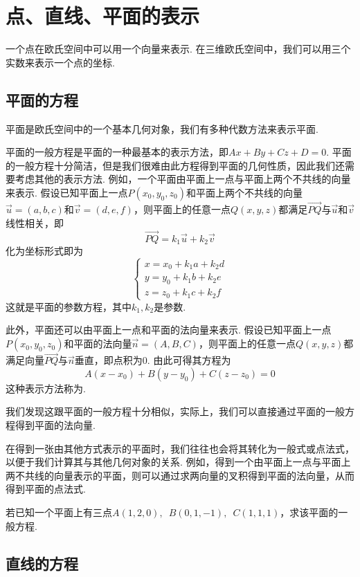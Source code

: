 \section{点、直线、平面的表示}

一个点在欧氏空间中可以用一个向量来表示. 在三维欧氏空间中，我们可以用三个实数来表示一个点的坐标.

\subsection{平面的方程}

平面是欧氏空间中的一个基本几何对象，我们有多种代数方法来表示平面.

平面的一般方程是平面的一种最基本的表示方法，即$Ax+By+Cz+D=0$. 平面的一般方程十分简洁，但是我们很难由此方程得到平面的几何性质，因此我们还需要考虑其他的表示方法. 例如，一个平面由平面上一点与平面上两个不共线的向量来表示. 假设已知平面上一点$P(x_0,y_0,z_0)$和平面上两个不共线的向量$\vec{u}=(a,b,c)$和$\vec{v}=(d,e,f)$，则平面上的任意一点$Q(x,y,z)$都满足$\overrightarrow{PQ}$与$\vec{u}$和$\vec{v}$线性相关，即
\[\overrightarrow{PQ}=k_1\vec{u}+k_2\vec{v}\]
化为坐标形式即为
\[\begin{cases}
        x=x_0+k_1a+k_2d \\
        y=y_0+k_1b+k_2e \\
        z=z_0+k_1c+k_2f
    \end{cases}\]
这就是平面的参数方程，其中$k_1,k_2$是参数.

此外，平面还可以由平面上一点和平面的法向量来表示. 假设已知平面上一点$P(x_0,y_0,z_0)$和平面的法向量$\vec{n}=(A,B,C)$，则平面上的任意一点$Q(x,y,z)$都满足向量$\overrightarrow{PQ}$与$\vec{n}$垂直，即点积为0. 由此可得其方程为\[A(x-x_0)+B(y-y_0)+C(z-z_0)=0\]这种表示方法称为.

我们发现这跟平面的一般方程十分相似，实际上，我们可以直接通过平面的一般方程得到平面的法向量.

在得到一张由其他方式表示的平面时，我们往往也会将其转化为一般式或点法式，以便于我们计算其与其他几何对象的关系. 例如，得到一个由平面上一点与平面上两不共线的向量表示的平面，则可以通过求两向量的叉积得到平面的法向量，从而得到平面的点法式.

\begin{example}{}{}
    若已知一个平面上有三点$A(1,2,0),\enspace B(0,1,-1),\enspace C(1,1,1)$，求该平面的一般方程.
\end{example}

\subsection{直线的方程}

